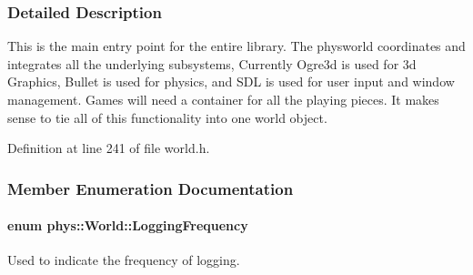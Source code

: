 \subsubsection{Detailed Description}
This is the main entry point for the entire library. The physworld coordinates and integrates all the underlying subsystems, Currently Ogre3d is used for 3d Graphics, Bullet is used for physics, and SDL is used for user input and window management. Games will need a container for all the playing pieces. It makes sense to tie all of this functionality into one world object. 

Definition at line 241 of file world.h.



\subsubsection{Member Enumeration Documentation}
\hypertarget{classphys_1_1World_a8c754464edbb78270fa0ee1e395b963d}{
\paragraph[{LoggingFrequency}]{\setlength{\rightskip}{0pt plus 5cm}enum {\bf phys::World::LoggingFrequency}}\hfill}
\label{classphys_1_1World_a8c754464edbb78270fa0ee1e395b963d}


Used to indicate the frequency of logging. 

